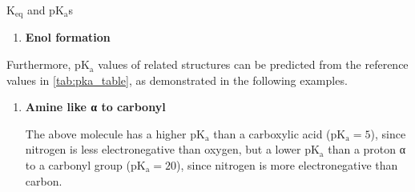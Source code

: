 \begin{core}{K$_\text{eq}$ and pK$_\text{a}$s}
\begin{enumerate}
        \item \textbf{Enol formation}


      \end{enumerate}

      Furthermore, pK$_\text{a}$ values of related structures can be predicted from the reference values in \autoref{tab:pka_table}, as demonstrated in the following examples.

      \begin{enumerate}

        \item \textbf{Amine like α to carbonyl}


        The above molecule has a higher pK$_\text{a}$ than a carboxylic acid (pK$_\text{a} = 5$), since nitrogen is less electronegative than oxygen, but a lower pK$_\text{a}$ than a proton α to a carbonyl group (pK$_\text{a} = 20$), since nitrogen is more electronegative than carbon.


\end{enumerate}
\end{core}
